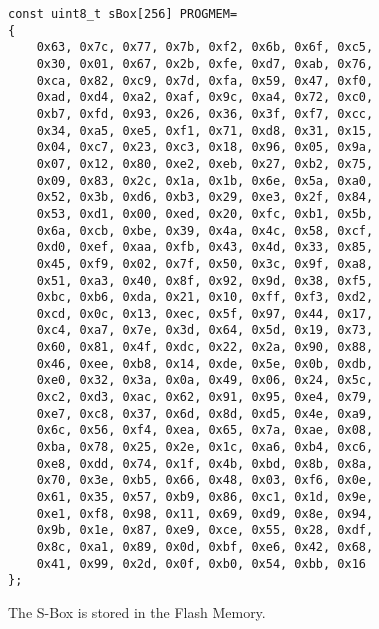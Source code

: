\documentclass[Report.tex]{subfiles}
\begin{document}
\begin{figure}[h]
\begin{lstlisting}[basicstyle=\tiny]
const uint8_t sBox[256] PROGMEM=
{
	0x63, 0x7c, 0x77, 0x7b, 0xf2, 0x6b, 0x6f, 0xc5,
	0x30, 0x01, 0x67, 0x2b, 0xfe, 0xd7, 0xab, 0x76,
	0xca, 0x82, 0xc9, 0x7d, 0xfa, 0x59, 0x47, 0xf0,
	0xad, 0xd4, 0xa2, 0xaf, 0x9c, 0xa4, 0x72, 0xc0,
	0xb7, 0xfd, 0x93, 0x26, 0x36, 0x3f, 0xf7, 0xcc,
	0x34, 0xa5, 0xe5, 0xf1, 0x71, 0xd8, 0x31, 0x15,
	0x04, 0xc7, 0x23, 0xc3, 0x18, 0x96, 0x05, 0x9a,
	0x07, 0x12, 0x80, 0xe2, 0xeb, 0x27, 0xb2, 0x75,
	0x09, 0x83, 0x2c, 0x1a, 0x1b, 0x6e, 0x5a, 0xa0,
	0x52, 0x3b, 0xd6, 0xb3, 0x29, 0xe3, 0x2f, 0x84,
	0x53, 0xd1, 0x00, 0xed, 0x20, 0xfc, 0xb1, 0x5b,
	0x6a, 0xcb, 0xbe, 0x39, 0x4a, 0x4c, 0x58, 0xcf,
	0xd0, 0xef, 0xaa, 0xfb, 0x43, 0x4d, 0x33, 0x85,
	0x45, 0xf9, 0x02, 0x7f, 0x50, 0x3c, 0x9f, 0xa8,
	0x51, 0xa3, 0x40, 0x8f, 0x92, 0x9d, 0x38, 0xf5,
	0xbc, 0xb6, 0xda, 0x21, 0x10, 0xff, 0xf3, 0xd2,
	0xcd, 0x0c, 0x13, 0xec, 0x5f, 0x97, 0x44, 0x17,
	0xc4, 0xa7, 0x7e, 0x3d, 0x64, 0x5d, 0x19, 0x73,
	0x60, 0x81, 0x4f, 0xdc, 0x22, 0x2a, 0x90, 0x88,
	0x46, 0xee, 0xb8, 0x14, 0xde, 0x5e, 0x0b, 0xdb,
	0xe0, 0x32, 0x3a, 0x0a, 0x49, 0x06, 0x24, 0x5c,
	0xc2, 0xd3, 0xac, 0x62, 0x91, 0x95, 0xe4, 0x79,
	0xe7, 0xc8, 0x37, 0x6d, 0x8d, 0xd5, 0x4e, 0xa9,
	0x6c, 0x56, 0xf4, 0xea, 0x65, 0x7a, 0xae, 0x08,
	0xba, 0x78, 0x25, 0x2e, 0x1c, 0xa6, 0xb4, 0xc6,
	0xe8, 0xdd, 0x74, 0x1f, 0x4b, 0xbd, 0x8b, 0x8a,
	0x70, 0x3e, 0xb5, 0x66, 0x48, 0x03, 0xf6, 0x0e,
	0x61, 0x35, 0x57, 0xb9, 0x86, 0xc1, 0x1d, 0x9e,
	0xe1, 0xf8, 0x98, 0x11, 0x69, 0xd9, 0x8e, 0x94,
	0x9b, 0x1e, 0x87, 0xe9, 0xce, 0x55, 0x28, 0xdf,
	0x8c, 0xa1, 0x89, 0x0d, 0xbf, 0xe6, 0x42, 0x68,
	0x41, 0x99, 0x2d, 0x0f, 0xb0, 0x54, 0xbb, 0x16
};
\end{lstlisting}
\caption{\label{SBOXFLASH} The S-Box is stored in the Flash Memory.}
\end{figure}
\end{document}
